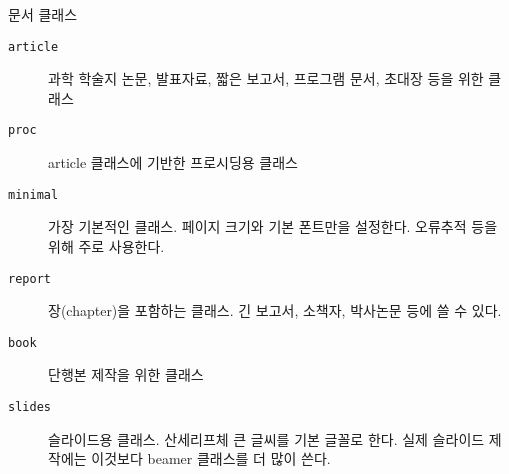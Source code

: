 
\begin{table}[!bp]
\caption{문서 클래스} \label{documentclasses}
\begin{lined}{\textwidth}
\begin{description}

\item [\normalfont\texttt{article}] 
  과학 학술지 논문, 발표자료, 짧은 보고서, 프로그램 문서, 초대장 등을 위한 클래스
\item [\normalfont\texttt{proc}] 
  article 클래스에 기반한 프로시딩용 클래스 
\item [\normalfont\texttt{minimal}] 
  가장 기본적인 클래스. 페이지 크기와 기본 폰트만을 설정한다. 오류추적 등을 위해 주로 사용한다.
\item [\normalfont\texttt{report}] 
  장(chapter)을 포함하는 클래스. 긴 보고서, 소책자, 박사논문 등에 쓸 수 있다.
\item [\normalfont\texttt{book}]
  단행본 제작을 위한 클래스
\item [\normalfont\texttt{slides}]
  슬라이드용 클래스. 산세리프체 큰 글씨를 기본 글꼴로 한다. 실제 슬라이드 제작에는 
  이것보다 beamer 클래스를 더 많이 쓴다.
\end{description}
\end{lined}
\end{table}

